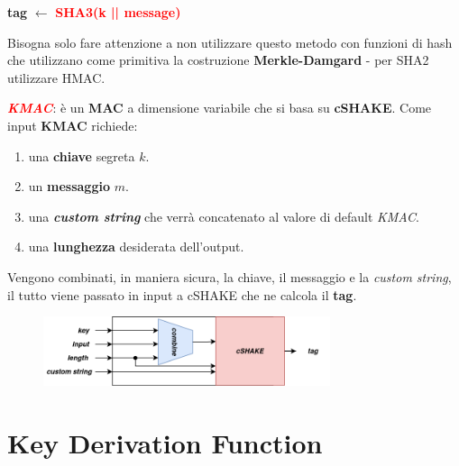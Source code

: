 \begin{flushleft}
    {\centering
        \textbf{tag} $\leftarrow$ \textcolor{red}{\textbf{SHA3(k || message)}}
    \par}

    Bisogna solo fare attenzione a non utilizzare questo metodo con funzioni di hash che utilizzano come primitiva la costruzione \textbf{Merkle-Damgard} - per SHA2 utilizzare HMAC.

    \smallskip

    \textcolor{red}{\textbf{\textit{KMAC}}}: è un \textbf{MAC} a dimensione variabile che si basa su \textbf{cSHAKE}. Come input \textbf{KMAC} richiede:
    \begin{enumerate}[nosep]
        \item una \textbf{chiave} segreta $k$.
        \item un \textbf{messaggio} $m$.
        \item una \textbf{\textit{custom string}} che verrà concatenato al valore di default \textit{KMAC}.
        \item una \textbf{lunghezza} desiderata dell'output.
    \end{enumerate}
    Vengono combinati, in maniera sicura, la chiave, il messaggio e la \textit{custom string}, il tutto viene passato in input a cSHAKE che ne calcola il \textbf{tag}.

    \begin{figure}[h]
        \centering
        \includegraphics[width=0.75\textwidth]{img/kmac.png}
    \end{figure}
\end{flushleft}

\newpage

\section{Key Derivation Function}

